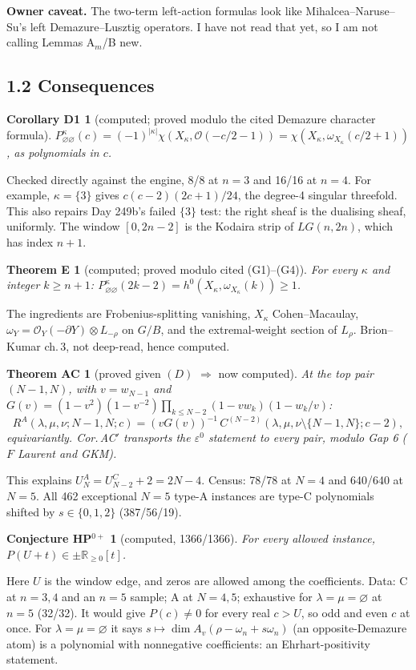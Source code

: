 \documentclass[11pt]{article}
\newcommand{\gr}[1]{\textsf{#1}}
\theoremstyle{plain}
\newtheorem*{thmE}{Theorem E}
\newtheorem*{corD1}{Corollary D1}
\newtheorem*{thmAC}{Theorem AC}
\newtheorem*{conj}{Conjecture HP$^{0+}$}
\begin{document}
\textbf{Owner caveat.} The two-term left-action formulas look like Mihalcea--Naruse--Su's left Demazure--Lusztig
operators. I have not read that yet, so I am not calling Lemmas A$_m$/B new.

\subsection*{1.2 Consequences}
\begin{corD1}[\gr{computed}; proved modulo the cited Demazure character formula]
$P^\kappa_{\varnothing\varnothing}(c)=(-1)^{|\kappa|}\chi(X_\kappa,\mathcal O(-c/2-1))=\chi(X_\kappa,\omega_{X_\kappa}(c/2+1))$,
as polynomials in $c$.
\end{corD1}
Checked directly against the engine, 8/8 at $n=3$ and 16/16 at $n=4$. For example, $\kappa=\{3\}$ gives
$c(c-2)(2c+1)/24$, the degree-4 singular threefold. This also repairs Day 249b's failed $\{3\}$ test: the right sheaf
is the dualising sheaf, uniformly. The window $[0,2n-2]$ is the Kodaira strip of $LG(n,2n)$, which has index $n+1$.

\begin{thmE}[\gr{computed}; proved modulo cited (G1)--(G4)]
For every $\kappa$ and integer $k\ge n+1$: $P^\kappa_{\varnothing\varnothing}(2k-2)=h^0(X_\kappa,\omega_{X_\kappa}(k))\ge1$.
\end{thmE}
The ingredients are Frobenius-splitting vanishing, $X_\kappa$ Cohen--Macaulay,
$\omega_Y=\mathcal O_Y(-\partial Y)\otimes L_{-\rho}$ on $G/B$, and the extremal-weight section of $L_\rho$. Brion--Kumar
ch.\,3, not deep-read, hence \gr{computed}.

\begin{thmAC}[proved given $(D)$ $\Rightarrow$ now \gr{computed}]
At the top pair $(N{-}1,N)$, with $v=w_{N-1}$ and
$G(v)=(1-v^2)(1-v^{-2})\prod_{k\le N-2}(1-vw_k)(1-w_k/v)$:
\[R^A(\lambda,\mu,\nu;N{-}1,N;c)=(vG(v))^{-1}\,C^{(N-2)}(\lambda,\mu,\nu\setminus\{N{-}1,N\};c-2),\]
equivariantly. Cor.\,AC$'$ transports the $\varepsilon^0$ statement to every pair, modulo Gap 6 ($F$ Laurent and GKM).
\end{thmAC}
This explains $U^A_N=U^C_{N-2}+2=2N-4$. Census: 78/78 at $N=4$ and 640/640 at $N=5$. All 462 exceptional $N=5$ type-A
instances are type-C polynomials shifted by $s\in\{0,1,2\}$ (387/56/19).

\begin{conj}[\gr{computed}, 1366/1366]
For every allowed instance, $P(U+t)\in\pm\mathbb R_{\ge0}[t]$.
\end{conj}
Here $U$ is the window edge, and zeros are allowed among the coefficients. Data: C at $n=3,4$ and an $n=5$ sample; A at
$N=4,5$; exhaustive for $\lambda=\mu=\varnothing$ at $n=5$ (32/32). It would give $P(c)\neq0$ for every real $c>U$, so
odd and even $c$ at once. For $\lambda=\mu=\varnothing$ it says $s\mapsto\dim A_v(\rho-\omega_n+s\omega_n)$ (an
opposite-Demazure atom) is a polynomial with nonnegative coefficients: an Ehrhart-positivity statement.
\end{document}
